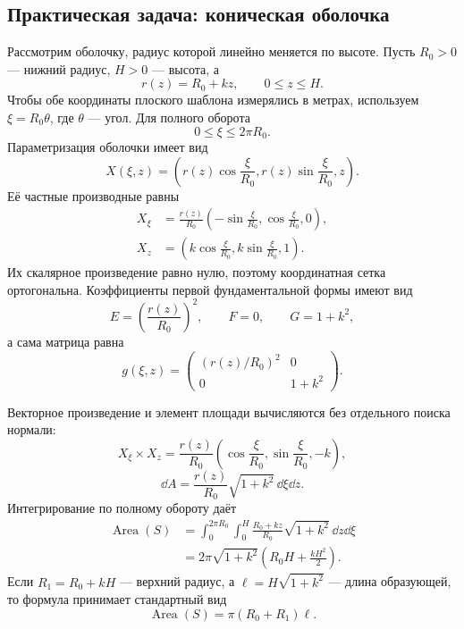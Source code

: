 \subsection{Практическая задача: коническая оболочка}

Рассмотрим оболочку, радиус которой линейно меняется по высоте. Пусть \(R_0>0\) --- нижний радиус, \(H>0\) --- высота, а
\[
r(z)=R_0+kz,
\qquad
0\leq z\leq H.
\]
Чтобы обе координаты плоского шаблона измерялись в метрах, используем \(\xi=R_0\theta\), где \(\theta\) --- угол. Для полного оборота
\[
0\leq\xi\leq2\pi R_0.
\]
Параметризация оболочки имеет вид
\begin{equation}
\label{eq:conical-shell-parameterization}
X(\xi,z)
=
\left(
 r(z)\cos\frac{\xi}{R_0},
 r(z)\sin\frac{\xi}{R_0},
 z
\right).
\end{equation}
Её частные производные равны
\[
\begin{aligned}
X_\xi
&=\frac{r(z)}{R_0}
\left(-\sin\frac{\xi}{R_0},
       \cos\frac{\xi}{R_0},0\right),\\
X_z
&=\left(k\cos\frac{\xi}{R_0},
          k\sin\frac{\xi}{R_0},1\right).
\end{aligned}
\]
Их скалярное произведение равно нулю, поэтому координатная сетка ортогональна. Коэффициенты первой фундаментальной формы имеют вид
\begin{equation}
\label{eq:conical-shell-metric}
E=\left(\frac{r(z)}{R_0}\right)^2,
\qquad
F=0,
\qquad
G=1+k^2,
\end{equation}
а сама матрица равна
\[
g(\xi,z)
=
\begin{pmatrix}
\left(r(z)/R_0\right)^2&0\\
0&1+k^2
\end{pmatrix}.
\]

Векторное произведение и элемент площади вычисляются без отдельного поиска нормали:
\[
X_\xi\times X_z
=\frac{r(z)}{R_0}
\left(
\cos\frac{\xi}{R_0},
\sin\frac{\xi}{R_0},
-k
\right),
\]
\begin{equation}
\label{eq:conical-shell-area-element}
\dd A
=\frac{r(z)}{R_0}\sqrt{1+k^2}\,\dd\xi\dd z.
\end{equation}
Интегрирование по полному обороту даёт
\begin{align}
\operatorname{Area}(S)
&=\int_0^{2\pi R_0}\int_0^H
\frac{R_0+kz}{R_0}\sqrt{1+k^2}\,\dd z\dd\xi\\
&=2\pi\sqrt{1+k^2}
\left(R_0H+\frac{kH^2}{2}\right).
\label{eq:conical-shell-area}
\end{align}
Если \(R_1=R_0+kH\) --- верхний радиус, а \(\ell=H\sqrt{1+k^2}\) --- длина образующей, то формула принимает стандартный вид
\begin{equation}
\label{eq:conical-shell-area-classic}
\operatorname{Area}(S)=\pi(R_0+R_1)\ell.
\end{equation}

